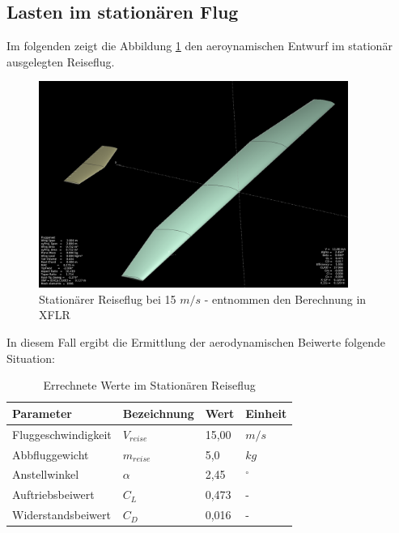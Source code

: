 \subsection{Lasten im stationären Flug}

Im folgenden zeigt die Abbildung \ref{fig:Stationärer Reiseflug in XFLR} den aeroynamischen Entwurf im stationär ausgelegten Reiseflug.

\begin{figure}[H]
\centering
\includegraphics[width=0.9\textwidth]{bilder/Fotos/Aeroentwurf_Fluegelkonstruktion.png}
\caption{Stationärer Reiseflug bei 15 $m/s$ - entnommen den Berechnung in XFLR} 
\label{fig:Stationärer Reiseflug in XFLR}
\end{figure}

In diesem Fall ergibt die Ermittlung der aerodynamischen Beiwerte folgende Situation:

\begin{table}[h]
\centering
\begin{tabular}{|l|l|l|l|}
\hline
Parameter  & Bezeichnung &  Wert & Einheit \\ \hline
Fluggeschwindigkeit  & $V_{reise}$ & 15,00 & $m/s$\\ \hline
Abbfluggewicht & $m_{reise}$  & 5,0 & $kg$\\ \hline
Anstellwinkel & $\alpha$ & 2,45 & $^\circ$ \\ \hline
Auftriebsbeiwert & $C_{L}$ & 0,473 & -\\ \hline
Widerstandsbeiwert & $C_{D}$ & 0,016  & -  \\ \hline
\end{tabular}
\caption{Errechnete Werte im Stationären Reiseflug}
\label{tab:Errechnete Werte im Stationären Reiseflug}
\end{table}

